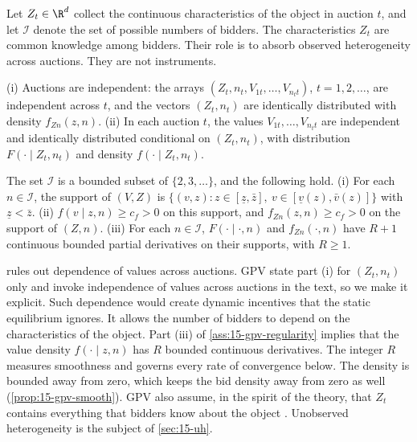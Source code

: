 Let $Z_t\in\R^d$ collect the continuous characteristics of the object in auction $t$, and let $\mathcal I$ denote the set of possible numbers of bidders. The characteristics $Z_t$ are common knowledge among bidders. Their role is to absorb observed heterogeneity across auctions. They are not instruments.

\begin{assumption}\label{ass:15-gpv-sampling}
(i) Auctions are independent: the arrays $(Z_t,n_t,V_{1t},\dots,V_{n_tt})$, $t=1,2,\dots$, are independent across $t$, and the vectors $(Z_t,n_t)$ are identically distributed with density $f_{Zn}(z,n)$.
(ii) In each auction $t$, the values $V_{1t},\dots,V_{n_tt}$ are independent and identically distributed conditional on $(Z_t,n_t)$, with distribution $F(\cdot\mid Z_t,n_t)$ and density $f(\cdot\mid Z_t,n_t)$.
\end{assumption}

\begin{assumption}\label{ass:15-gpv-regularity}
The set $\mathcal I$ is a bounded subset of $\{2,3,\dots\}$, and the following hold.
(i) For each $n\in\mathcal I$, the support of $(V,Z)$ is $\{(v,z):z\in[\underline z,\bar z],\ v\in[\underline v(z),\bar v(z)]\}$ with $\underline z<\bar z$.
(ii) $f(v\mid z,n)\ge c_f>0$ on this support, and $f_{Zn}(z,n)\ge c_f>0$ on the support of $(Z,n)$.
(iii) For each $n\in\mathcal I$, $F(\cdot\mid\cdot,n)$ and $f_{Zn}(\cdot,n)$ have $R+1$ continuous bounded partial derivatives on their supports, with $R\ge 1$.
\end{assumption}

 rules out dependence of values across auctions. GPV state part (i) for $(Z_t,n_t)$ only and invoke independence of values across auctions in the text, so we make it explicit. Such dependence would create dynamic incentives that the static equilibrium ignores. It allows the number of bidders to depend on the characteristics of the object. Part (iii) of \cref{ass:15-gpv-regularity} implies that the value density $f(\cdot\mid z,n)$ has $R$ bounded continuous derivatives. The integer $R$ measures smoothness and governs every rate of convergence below. The density is bounded away from zero, which keeps the bid density away from zero as well (\cref{prop:15-gpv-smooth}). GPV also assume, in the spirit of the theory, that $Z_t$ contains everything that bidders know about the object \citep[footnote 11]{GuerrePerrigneVuong2000}. Unobserved heterogeneity is the subject of \cref{sec:15-uh}.

